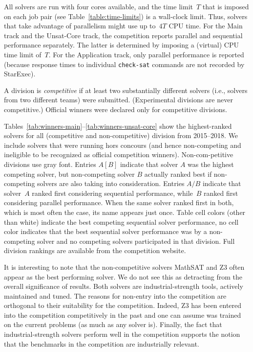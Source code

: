 \documentclass[dvipsnames,table,twoside,11pt]{article}
\begin{document}
All solvers are run with four cores available, and the time limit~$T$
that is imposed on each job pair (see Table~\ref{table:time-limits})
is a wall-clock limit.  Thus, solvers that take advantage of
parallelism might use up to~$4T$ CPU time.  For the Main track and the
Unsat-Core track, the competition reports parallel and sequential
performance separately.  The latter is determined by imposing a
(virtual) CPU time limit of~$T$.  For the Application track, only
parallel performance is reported (because response times to individual
{\tt check-sat} commands are not recorded by StarExec).

A division is \emph{competitive} if
at least two substantially different solvers (i.e., solvers from two
different teams) were submitted.  (Experimental divisions are never
competitive.)  Official winners were declared only for competitive
divisions.

Tables~\ref{tab:winners-main}--\ref{tab:winners-unsat-core} show the
highest-ranked solvers for all (competitive and non-competitive) division from
2015--2018.
We include solvers that were running hors concours (and hence non-competing
and ineligible to be recognized as official competition winners).
Non-com-petitive divisions use gray font.
Entries $A [B]$ indicate that solver $A$ was the highest competing solver,
but non-competing solver $B$ actually ranked best if non-competing solvers
are also taking into consideration.
Entries
$A/B$ indicate that solver~$A$ ranked first considering sequential
performance, while~$B$ ranked first considering parallel performance.
When the same solver ranked first in both, which is most often the
case, its name appears just once.
Table cell colors (other than white) indicate the best competing sequential
solver performance, no cell color indicates that the best sequential solver
performance was by a non-competing solver and no competing solvers participated
in that division.
Full division rankings are available from the competition website.

It is interesting to note that the non-competitive solvers MathSAT and Z3 often appear as the best performing solver. We do not see this as detracting from the overall significance of results. Both solvers are industrial-strength tools, actively maintained and tuned. The reasons for non-entry into the competition are orthogonal to their suitability for the competition. Indeed, Z3 has been entered into the competition competitively in the past and one can assume was trained on the current problems (as much as any solver is). Finally, the fact that industrial-strength solvers perform well in the competition supports the notion that the benchmarks in the competition are industrially relevant.
\end{document}
